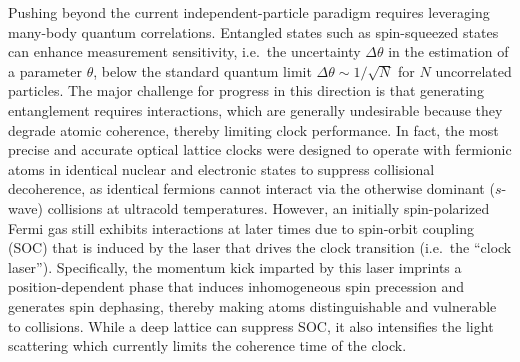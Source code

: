\documentclass[aps,prx,superscriptaddress,notitlepage,twocolumn,longbibliography]{revtex4-2}
\begin{document}
Pushing beyond the current independent-particle paradigm requires leveraging many-body quantum correlations.
Entangled states such as spin-squeezed states\cite{kitagawa1993squeezed, wineland1992spin, ma2011quantum} can enhance measurement sensitivity, i.e.~the uncertainty $\Delta\theta$ in the estimation of a parameter $\theta$, below the standard quantum limit $\Delta\theta\sim1/\sqrt{N}$ for $N$ uncorrelated particles\cite{itano1993quantum, degen2017quantum}.
The major challenge for progress in this direction is that generating entanglement requires interactions, which are generally undesirable because they degrade atomic coherence, thereby limiting clock performance\cite{swallows2011suppression, martin2013quantum, rey2014probing, ludlow2011coldcollisionshift, lemke2011wave, ludlow2015optical}.
In fact, the most precise and accurate optical lattice clocks were designed to operate with fermionic atoms in identical nuclear and electronic states to suppress collisional decoherence\cite{campbell2009probing, swallows2011suppression, campbell2017fermidegenerate}, as identical fermions cannot interact via the otherwise dominant ($s$-wave) collisions at ultracold temperatures.
However, an initially spin-polarized Fermi gas still exhibits interactions at later times due to spin-orbit coupling (SOC) that is induced by the laser that drives the clock transition (i.e.~the ``clock laser'')\cite{wall2016synthetic, kolkowitz2016spinorbitcoupled, livi2016synthetic, bromley2018dynamics}.
Specifically, the momentum kick imparted by this laser imprints a position-dependent phase that induces inhomogeneous spin precession and generates spin dephasing, thereby making atoms distinguishable and vulnerable to collisions.
While a deep lattice can suppress SOC, it also intensifies the light scattering which currently limits the coherence time of the clock\cite{dorscher2018latticeinduced, goban2018emergence, hutson2019engineering}.
\end{document}
